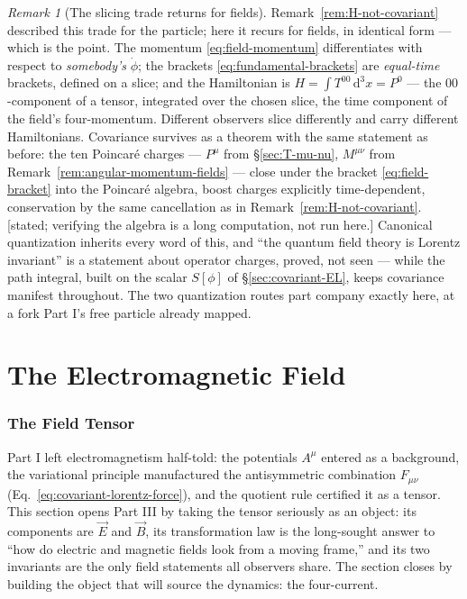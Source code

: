 \documentclass[11pt]{article}
\theoremstyle{plain}
\theoremstyle{definition}
\theoremstyle{remark}
\newtheorem{remark}[theorem]{Remark}
\newcommand{\dd}{\mathrm{d}}
\newcommand{\vE}{\vec{E}}
\newcommand{\vB}{\vec{B}}
\begin{document}
\begin{remark}[The slicing trade returns for fields]
\label{rem:slicing-again}
Remark~\ref{rem:H-not-covariant} described this trade for the
particle; here it recurs for fields, in identical form --- which is
the point.
The momentum \eqref{eq:field-momentum} differentiates with respect to
\emph{somebody's} $\dot\phi$; the brackets
\eqref{eq:fundamental-brackets} are \emph{equal-time} brackets,
defined on a slice; and the Hamiltonian is
$H = \int T^{00}\,\dd^3x = P^0$ --- the $00$-component of a tensor,
integrated over the chosen slice, the time component of the field's
four-momentum. Different observers slice differently and carry
different Hamiltonians. Covariance survives as a theorem with the
same statement as before: the ten Poincar\'e charges --- $P^\mu$ from
\S\ref{sec:T-mu-nu}, $M^{\mu\nu}$ from
Remark~\ref{rem:angular-momentum-fields} --- close under the bracket
\eqref{eq:field-bracket} into the Poincar\'e algebra, boost charges
explicitly time-dependent, conservation by the same cancellation as
in Remark~\ref{rem:H-not-covariant}. [stated; verifying the algebra is a
long computation, not run here.] Canonical quantization inherits
every word of this, and ``the quantum field theory is Lorentz
invariant'' is a statement about operator charges, proved, not seen
--- while the path integral, built on the scalar $S[\phi]$ of
\S\ref{sec:covariant-EL}, keeps covariance manifest throughout. The
two quantization routes part company exactly here, at a fork Part I's
free particle already mapped.
\end{remark}

\clearpage
\part{The Electromagnetic Field}

\section{The Field Tensor}
\label{sec:field-tensor}

Part I left electromagnetism half-told: the potentials $A^\mu$
entered as a background, the variational principle manufactured the
antisymmetric combination $F_{\mu\nu}$
(Eq.~\eqref{eq:covariant-lorentz-force}), and the quotient rule
certified it as a tensor. This section opens Part III by taking the
tensor seriously as an object: its components are $\vE$ and $\vB$,
its transformation law is the long-sought answer to ``how do
electric and magnetic fields look from a moving frame,'' and its two
invariants are the only field statements all observers share. The
section closes by building the object that will source the dynamics:
the four-current.
\end{document}
